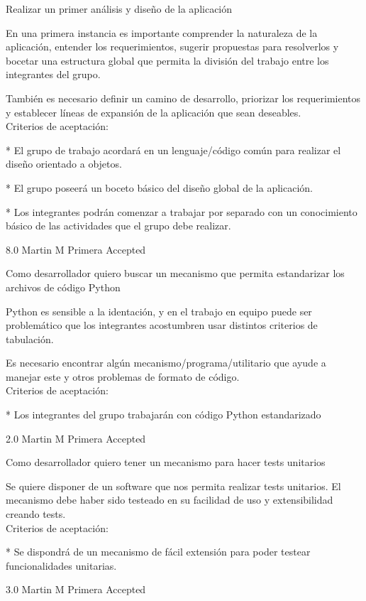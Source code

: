	{Realizar un primer análisis y diseño de la aplicación} %
	{En una primera instancia es importante comprender la naturaleza de la
aplicación, entender los requerimientos, sugerir propuestas para resolverlos y
bocetar una estructura global que permita la división del trabajo entre los
integrantes del grupo.
  
También es necesario definir un camino de desarrollo, priorizar los
requerimientos y establecer líneas de expansión de la aplicación que sean
deseables.
   \\ 
Criterios de aceptación:

* El grupo de trabajo acordará en un lenguaje/código común para realizar el diseño orientado a objetos.

* El grupo poseerá un boceto básico del diseño global de la aplicación.

* Los integrantes podrán comenzar a trabajar por separado con un conocimiento básico de las actividades que el grupo debe realizar.  
} %
	{} %
	{8.0} %
	{Martin M} %
	{Primera} %
	{Accepted} %


\vspace{20pt}

	{Como desarrollador quiero buscar un mecanismo que permita estandarizar los archivos de código Python} %
	{Python es sensible a la identación, y en el trabajo en equipo puede ser
problemático que los integrantes acostumbren usar distintos criterios de
tabulación.

Es necesario encontrar algún mecanismo/programa/utilitario que ayude a manejar
este y otros problemas de formato de código.
  \\
Criterios de aceptación:

* Los integrantes del grupo trabajarán con código Python estandarizado  
} %
	{} %
	{2.0} %
	{Martin M} %
	{Primera} %
	{Accepted} %


\vspace{20pt}

	{Como desarrollador quiero tener un mecanismo para hacer tests unitarios} %
	{Se quiere disponer de un software que nos permita realizar tests unitarios. El
mecanismo debe haber sido testeado en su facilidad de uso y extensibilidad
creando tests.
  \\
Criterios de aceptación:
  
* Se dispondrá de un mecanismo de fácil extensión para poder testear funcionalidades unitarias. 
} %
	{} %
	{3.0} %
	{Martin M} %
	{Primera} %
	{Accepted} %

